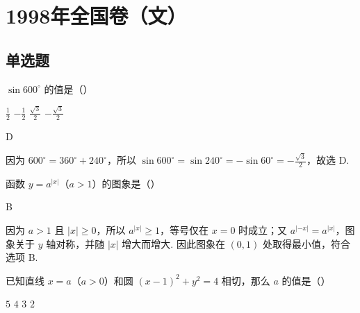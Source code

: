 \documentclass[UTF8,a4paper,oneside,11pt]{ctexbook}
\begin{document}
\mainmatter

\chapter{1998年全国卷（文）}
\section{单选题}

\begin{problem}
\(\sin 600^{\circ}\) 的值是（\quad）

\choices
    {\(\frac{1}{2}\)}
    {\(-\frac{1}{2}\)}
    {\(\frac{\sqrt{3}}{2}\)}
    {\(-\frac{\sqrt{3}}{2}\)}
\end{problem}

\begin{answer}
D
\end{answer}

\begin{solution}
因为 \(600^{\circ}=360^{\circ}+240^{\circ}\)，所以
\(\sin 600^{\circ}=\sin 240^{\circ}=-\sin 60^{\circ}=-\frac{\sqrt{3}}{2}\)，故选 D.
\end{solution}

\begin{problem}
函数 \(y=a^{|x|}\)（\(a>1\)）的图象是（\quad）

\choices
    {}
    {}
    {}
    {}
\end{problem}

\begin{answer}
B
\end{answer}

\begin{solution}
因为 \(a>1\) 且 \(|x|\geqslant0\)，所以 \(a^{|x|}\geqslant1\)，等号仅在 \(x=0\) 时成立；又 \(a^{|-x|}=a^{|x|}\)，图象关于 \(y\) 轴对称，并随 \(|x|\) 增大而增大. 因此图象在 \((0,1)\) 处取得最小值，符合选项 B.
\end{solution}

\begin{problem}
已知直线 \(x=a\)（\(a>0\)）和圆 \((x - 1)^2 + y^2 = 4\) 相切，那么 \(a\) 的值是（\quad）

\choices
    {\(5\)}
    {\(4\)}
    {\(3\)}
    {\(2\)}
\end{problem}
\end{document}
